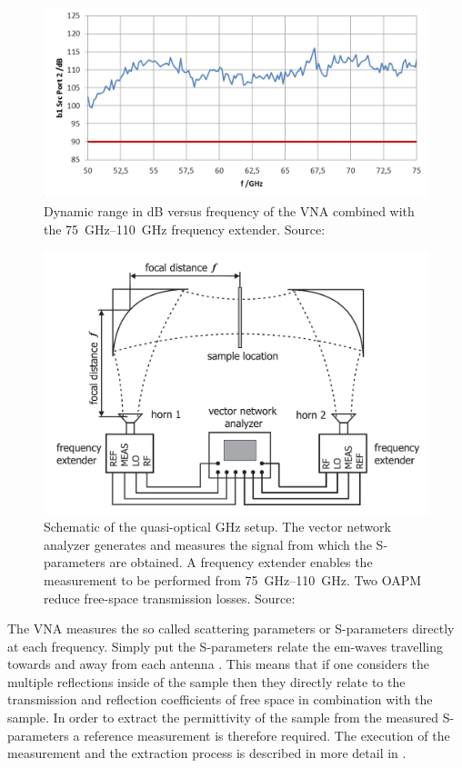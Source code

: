 \begin{figure}[H]
    \centering
    \includegraphics[scale=0.4]{images/3_chapter03/DNR.png}
    \caption{Dynamic range in dB versus frequency of the VNA combined with the \SIrange[range-phrase=--]{75}{110}{\giga \hertz} frequency extender. Source: \cite{VNADNR2013}}
    \label{fig:VNA_DNR}
\end{figure}

\begin{figure}[H]
    \centering
    \includegraphics[scale=0.4]{images/3_chapter03/ghz.png}
    \caption{Schematic of the quasi-optical GHz setup. The vector network analyzer generates and measures the signal from which the S-parameters are obtained. A frequency extender enables the measurement to be performed from \SIrange{75}{110}{\giga \hertz}. Two OAPM reduce free-space transmission losses. Source: \cite{Kazemipour2015}}
    \label{fig:GHz_setup}
\end{figure}

The VNA measures the so called scattering parameters or S-parameters directly at each frequency. Simply put the S-parameters relate the em-waves travelling towards and away from each antenna \cite{Caspers2012}. This means that if one considers the multiple reflections inside of the sample then they directly relate to the transmission and reflection coefficients of free space in combination with the sample. In order to extract the permittivity of the sample from the measured S-parameters a reference measurement is therefore required. The execution of the measurement and the extraction process is described in more detail in \cite{Kazemipour2015}. 
